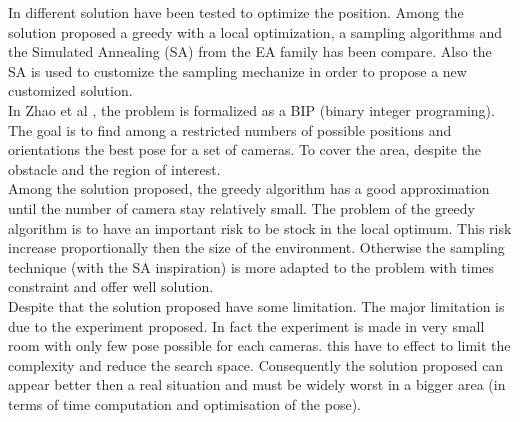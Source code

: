 In \cite{151*zhao2013} different solution have been tested to optimize the position. Among the solution proposed a greedy with a local optimization,  a sampling algorithms and the Simulated Annealing (SA) from the EA family has been compare.  Also the SA is used to customize the sampling mechanize in order to propose a new customized solution. \\
In Zhao et al \cite{151*zhao2013}, the problem is formalized as a BIP (binary integer programing). %
  The goal is to find among a restricted numbers of possible positions and orientations the best pose for a set of cameras. To cover the area, despite the obstacle and the region of interest. \\
Among the solution proposed, the greedy algorithm has a good approximation until the number of camera stay relatively small. The problem of the greedy algorithm is to have an important risk to be stock in the local optimum. This risk increase proportionally then the size of the environment. Otherwise the sampling technique (with the SA inspiration) is more adapted to the problem with times constraint and offer well solution.\\
Despite that the solution proposed have some limitation. The major limitation is due to the experiment proposed. In fact the experiment is made in very small room with only few pose possible  for each cameras. this  have to effect to limit the complexity and reduce the search space. Consequently the solution proposed can appear better then a real situation and must be widely worst in a bigger area (in terms of time computation and  optimisation of the pose).\\

